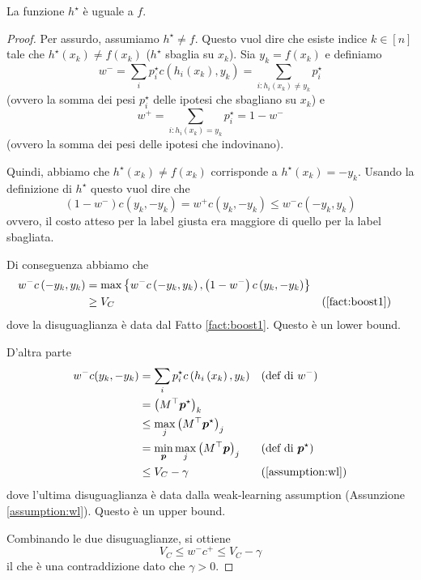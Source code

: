 \begin{theorem}
    La funzione $h^\star$ è uguale a $f$.
\end{theorem}
\begin{proof}
    Per assurdo, assumiamo $h^\star \neq f$. Questo vuol dire che esiste indice $k \in [n]$ tale che $h^\star (x_k) \neq f(x_k)$ ($h^\star$ sbaglia su $x_k$). Sia $y_k = f(x_k)$ e definiamo
    $$ w^- = \sum_i p_i^\star c \left(h_i (x_k), y_k \right) = \sum_{i: h_i (x_k) \neq y_k} p_i^\star$$
    (ovvero la somma dei pesi $p^\star_i$ delle ipotesi che sbagliano su $x_k$) e
    $$w^+ = \sum_{i: h_i (x_k) = y_k} p_i^\star = 1 - w^- $$
    (ovvero la somma dei pesi delle ipotesi che indovinano).

    Quindi, abbiamo che $h^\star (x_k) \neq f(x_k)$ corrisponde a $h^\star(x_k) = -y_k $. Usando la definizione di $h^\star$ questo vuol dire che
    $$ \left(1 - w^- \right) c \left(y_k, - y_k\right) = w^+ c \left(y_k, -y_k\right) \leq w^- c \left(-y_k, y_k \right) $$
	ovvero, il costo atteso per la label giusta era maggiore di quello per la label sbagliata.

    Di conseguenza abbiamo che
	\begin{align*}
		w^- c \left(-y_k, y_k \right) & = \max \left\{w^- c \left(-y_k, y_k\right), \left(1 - w^-\right) c \left(y_k, -y_k\right)\right\} \\
		& \geq V_C && (\ref{fact:boost1})
	\end{align*}
    dove la disuguaglianza è data dal Fatto \ref{fact:boost1}. Questo è un lower bound.

    D'altra parte
    \begin{align*}
        w^- c(y_k, -y_k) & = \sum_i p_i^\star c \left(h_i \left(x_k\right), y_k \right) && (\text{def di } w^-) \\
        & = \left(M^\top \bm p^\star\right)_k \\
        & \leq \max_j \left(M^\top \bm p^\star\right)_j \\
        & = \min_{\bm p} \max_j \left(M^\top \bm p\right)_j && (\text{def di } \bm p^\star) \\
        & \leq V_C - \gamma && (\ref{assumption:wl})
    \end{align*}
    dove l'ultima disuguaglianza è data dalla weak-learning assumption (Assunzione \ref{assumption:wl}). Questo è un upper bound.

    Combinando le due disuguaglianze, si ottiene
    $$ V_C \leq w^- c^+ \leq V_C - \gamma $$
    il che è una contraddizione dato che $\gamma > 0$.
\end{proof}

